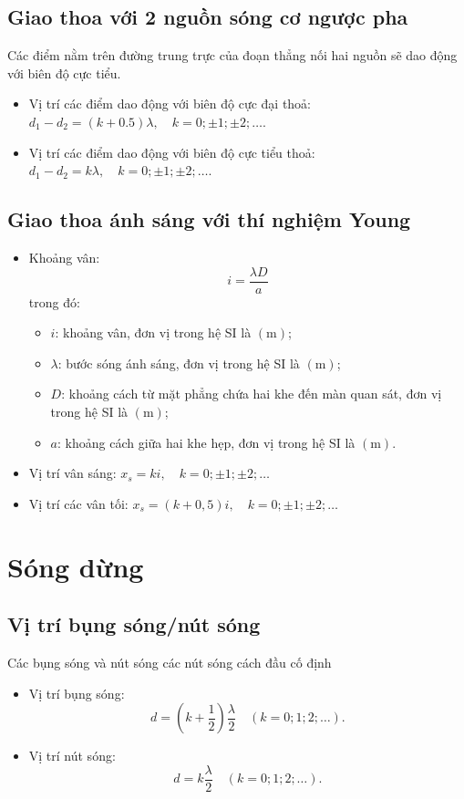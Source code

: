 \subsection{Giao thoa với 2 nguồn sóng cơ ngược pha}
Các điểm nằm trên đường trung trực của đoạn thẳng nối hai nguồn sẽ dao động với biên độ cực tiểu.
\begin{itemize}
	\item Vị trí các điểm dao động với biên độ cực đại thoả: $d_1-d_2=\left(k+0.5\right)\lambda, \quad k=0; \pm1; \pm2; \dots$.
	\item Vị trí các điểm dao động với biên độ cực tiểu thoả: $d_1-d_2=k\lambda, \quad k=0; \pm1; \pm2; \dots$.
\end{itemize}
\subsection{Giao thoa ánh sáng với thí nghiệm Young}
\begin{itemize}
	\item Khoảng vân: $$i=\dfrac{\lambda D}{a}$$
	trong đó:
	\begin{itemize}
		\item $i$: khoảng vân, đơn vị trong hệ SI là $\left(\si{\meter}\right)$;
		\item $\lambda$: bước sóng ánh sáng, đơn vị trong hệ SI là $\left(\si{\meter}\right)$;
		\item $D$: khoảng cách từ mặt phẳng chứa hai khe đến màn quan sát, đơn vị trong hệ SI là $\left(\si{\meter}\right)$;
		\item $a$: khoảng cách giữa hai khe hẹp, đơn vị trong hệ SI là $\left(\si{\meter}\right)$.
	\end{itemize}
\item Vị trí vân sáng: $x_s=ki,\quad k=0; \pm 1; \pm 2; \dots$
\item Vị trí các vân tối: $x_s=\left(k+0,5\right)i,\quad k=0; \pm 1; \pm 2; \dots$
\end{itemize}
\section{Sóng dừng}
\subsection{Vị trí bụng sóng/nút sóng}
Các bụng sóng và nút sóng các nút sóng cách đầu cố định
\begin{itemize}
	\item Vị trí bụng sóng: 
	$$d=\left(k+\dfrac{1}{2}\right)\dfrac{\lambda}{2}\quad\left(k=0; 1; 2; \dots\right).$$
	\item Vị trí nút sóng:
	$$d=k\dfrac{\lambda}{2}\quad\left(k=0; 1; 2; \dots\right).$$
\end{itemize}

